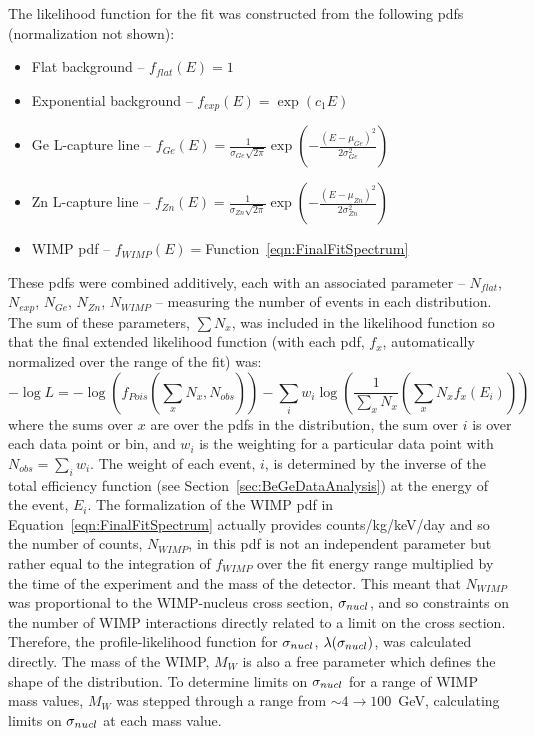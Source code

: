 The likelihood function for the fit was constructed from the following pdfs (normalization not shown):	
		\begin{itemize}
			\item Flat background --  $f_{flat}(E) = 1$
			\item Exponential background --  $f_{exp}(E) = \exp\left(c_{1} E\right)$				
			\item Ge L-capture line -- $f_{Ge}(E) = \frac{1}{\sigma_{Ge}\sqrt{2 \pi}} 
								\exp\left(-\frac{(E - \mu_{Ge})^{2}}{2 \sigma_{Ge}^{2}}\right)$
			\item Zn L-capture line -- $f_{Zn}(E) = \frac{1}{\sigma_{Zn}\sqrt{2 \pi}} 
								\exp\left(-\frac{(E - \mu_{Zn})^{2}}{2 \sigma_{Zn}^{2}}\right)$				
								
			\item WIMP pdf -- $f_{WIMP}(E) = $Function~\ref{eqn:FinalFitSpectrum}				
		\end{itemize}			
These pdfs were combined additively, each with an associated parameter -- $N_{flat}$, $N_{exp}$, $N_{Ge}$, $N_{Zn}$, $N_{WIMP}$  -- measuring the number of events in each distribution.  The sum of these parameters, $\sum N_{x}$, was included in the likelihood function so that the final extended likelihood function (with each pdf, $f_{x}$, automatically normalized over the range of the fit) was:
		\begin{equation}
			- \log L = -\log \left( f_{Pois} \left( \sum_{x} N_{x}, N_{obs} \right) \right) 
					- \sum_{i} w_{i} \log \left( 
						\frac{1}{\sum_{x} N_{x}} 
							\left( \sum_{x} N_{x} f_{x} (E_{i})
							\right) 
						\right)
		\end{equation}
where the sums over $x$ are over the pdfs in the distribution, the sum over $i$ is over each data point or bin, and $w_{i}$ is the weighting for a particular data point with $N_{obs} = \sum_{i} w_{i}$.  The weight of each event, $i$, is determined by the inverse of the total efficiency function (see Section~\ref{sec:BeGeDataAnalysis}) at the energy of the event, $E_{i}$.  The formalization of the WIMP pdf in Equation~\ref{eqn:FinalFitSpectrum} actually provides counts/kg/keV/day and so the number of counts, $N_{WIMP}$, in this pdf is not an independent parameter but rather equal to the integration of $f_{WIMP}$ over the fit energy range multiplied by the time of the experiment and the mass of the detector.  This meant that $N_{WIMP}$ was proportional to the WIMP-nucleus cross section, $\sigma_{nucl}$, and so constraints on the number of WIMP interactions directly related to a limit on the cross section.  Therefore, the profile-likelihood function for $\sigma_{nucl}$, $\lambda(\sigma_{nucl})$, was calculated directly.  The mass of the WIMP, $M_{W}$ is also a free parameter which defines the shape of the distribution.  To determine limits on $\sigma_{nucl}$ for a range of WIMP mass values, $M_{W}$ was stepped through a range from $\sim4\to100$~GeV, calculating limits on $\sigma_{nucl}$ at each mass value.  

